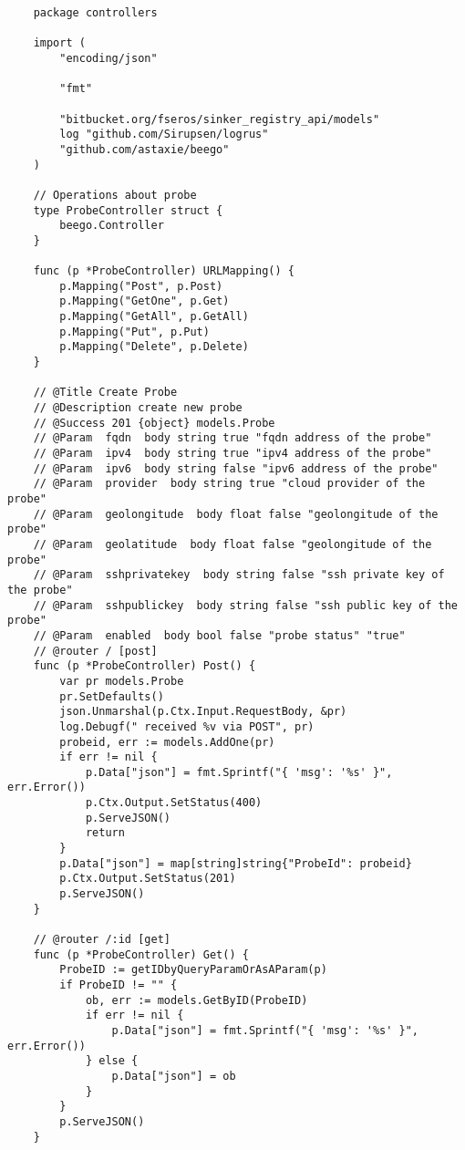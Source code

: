 \begin{verbatim}
    package controllers
    
    import (
        "encoding/json"
    
        "fmt"
    
        "bitbucket.org/fseros/sinker_registry_api/models"
        log "github.com/Sirupsen/logrus"
        "github.com/astaxie/beego"
    )
    
    // Operations about probe
    type ProbeController struct {
        beego.Controller
    }
    
    func (p *ProbeController) URLMapping() {
        p.Mapping("Post", p.Post)
        p.Mapping("GetOne", p.Get)
        p.Mapping("GetAll", p.GetAll)
        p.Mapping("Put", p.Put)
        p.Mapping("Delete", p.Delete)
    }
    
    // @Title Create Probe
    // @Description create new probe
    // @Success 201 {object} models.Probe
    // @Param  fqdn  body string true "fqdn address of the probe"
    // @Param  ipv4  body string true "ipv4 address of the probe"
    // @Param  ipv6  body string false "ipv6 address of the probe"
    // @Param  provider  body string true "cloud provider of the probe"
    // @Param  geolongitude  body float false "geolongitude of the probe"
    // @Param  geolatitude  body float false "geolongitude of the probe"
    // @Param  sshprivatekey  body string false "ssh private key of the probe"
    // @Param  sshpublickey  body string false "ssh public key of the probe"
    // @Param  enabled  body bool false "probe status" "true"
    // @router / [post]
    func (p *ProbeController) Post() {
        var pr models.Probe
        pr.SetDefaults()
        json.Unmarshal(p.Ctx.Input.RequestBody, &pr)
        log.Debugf(" received %v via POST", pr)
        probeid, err := models.AddOne(pr)
        if err != nil {
            p.Data["json"] = fmt.Sprintf("{ 'msg': '%s' }", err.Error())
            p.Ctx.Output.SetStatus(400)
            p.ServeJSON()
            return
        }
        p.Data["json"] = map[string]string{"ProbeId": probeid}
        p.Ctx.Output.SetStatus(201)
        p.ServeJSON()
    }
    
    // @router /:id [get]
    func (p *ProbeController) Get() {
        ProbeID := getIDbyQueryParamOrAsAParam(p)
        if ProbeID != "" {
            ob, err := models.GetByID(ProbeID)
            if err != nil {
                p.Data["json"] = fmt.Sprintf("{ 'msg': '%s' }", err.Error())
            } else {
                p.Data["json"] = ob
            }
        }
        p.ServeJSON()
    }
    

\end{verbatim}

